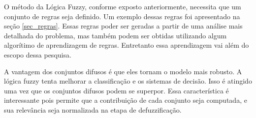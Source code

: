 O método da Lógica Fuzzy, conforme exposto anteriormente, necessita que um
conjunto de regras seja definido. Um exemplo dessas regras foi apresentado na
seção \ref{sec_regras}. Essas regras poder ser geradas a partir de uma
análise mais detalhada do problema, mas também podem ser obtidas utilizando
algum algorítimo de aprendizagem de regras. Entretanto essa aprendizagem vai
além do escopo dessa pesquisa.

A vantagem dos conjuntos difusos é que eles tornam o modelo mais robusto. A
lógica fuzzy tenta melhorar a classificação e os sistemas de decisão. Isso é
atingido uma vez que os conjuntos difusos podem se superpor. Essa
característica é interessante pois permite que a contribuição de cada conjunto
seja computada, e sua relevância seja normalizada na etapa de defuzzificação.

